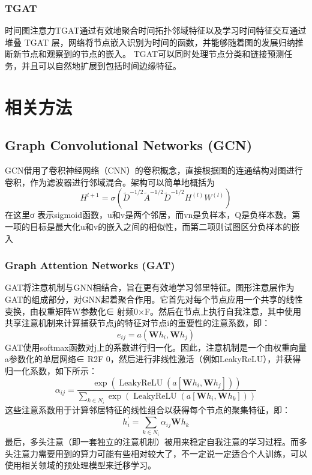 \documentclass[conference]{IEEEtran}
\begin{document}
\subsubsection{TGAT}
时间图注意力TGAT\cite{cui2021dygcn}通过有效地聚合时间拓扑邻域特征以及学习时间特征交互通过堆叠 TGAT 层，网络将节点嵌入识别为时间的函数，并能够随着图的发展归纳推断新节点和观察到的节点的嵌入。
TGAT可以同时处理节点分类和链接预测任务，并且可以自然地扩展到包括时间边缘特征。


\section{相关方法}

\subsection{Graph Convolutional Networks (GCN)}
GCN\cite{kipf2016semi}借用了卷积神经网络（CNN）的卷积概念，直接根据图的连通结构对图进行卷积，作为滤波器进行邻域混合。架构可以简单地概括为
\begin{equation}
H^{l+1}=\sigma\left(\tilde{D}^{-1 / 2} \tilde{A}^{-1 / 2} \tilde{D}^{-1 / 2} H^{(l)} W^{(l)}\right)
\end{equation}
在这里σ 表示sigmoid函数，u和v是两个邻居，而vn是负样本，Q是负样本数。第一项的目标是最大化u和v的嵌入之间的相似性，而第二项则试图区分负样本的嵌入

\subsubsection{Graph Attention Networks (GAT)}
GAT\cite{velivckovic2017graph}将注意机制与GNN相结合，旨在更有效地学习邻里特征。图形注意层作为GAT的组成部分，对GNN起着聚合作用。它首先对每个节点应用一个共享的线性变换，由权重矩阵W参数化∈ 射频0×F。然后在节点上执行自我注意，其中使用共享注意机制来计算捕获节点j的特征对节点i的重要性的注意系数，即：
\begin{equation}
e_{i j}=a\left(\mathbf{W} h_{i}, \mathbf{W} h_{j}\right)
\end{equation}
GAT使用softmax函数对j上的系数进行归一化。因此，注意机制是一个由权重向量a参数化的单层网络∈ R2F 0，然后进行非线性激活（例如LeakyReLU），并获得归一化系数，如下所示：
\begin{equation}
\alpha_{i j}=\frac{\exp \left(\operatorname{LeakyReLU}\left(a\left[\mathbf{W} h_{i}, \mathbf{W} h_{j}\right]\right)\right)}{\sum_{k \in N_{i}} \exp \left(\operatorname{LeakyReLU}\left(a\left[\mathbf{W} h_{i}, \mathbf{W} h_{k}\right]\right)\right)}
\end{equation}
这些注意系数用于计算邻居特征的线性组合以获得每个节点的聚集特征，即：
\begin{equation}
h_{i}^{\prime}=\sum_{k \in N_{i}} \alpha_{i j} \mathbf{W} h_{k}
\end{equation}
最后，多头注意（即一套独立的注意机制）被用来稳定自我注意的学习过程。而多头注意力需要用到的算力可能有些相对较大了，不一定说一定适合个人训练，可以使用相关领域的预处理模型来迁移学习。
\end{document}
